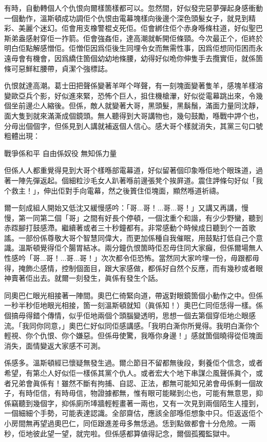 有時，自動轉個人个仇恨向爾樣箇樣都可以。忽然間，好似發完惡夢彈起身感衝動一個動作，溫斯頓成功調佢个仇恨由電幕塊樣向後邊个深色頭髮女子，就見到精彩、美麗个迷幻。佢會用支橡警棍攴死佢。佢會綁住佢个赤身喺條柱道，好似聖巴斯弟盎感射穿佢一拃箭。佢會強姦佢，達高潮就斬開佢條頸。今次最正个，佢終於明白佢點解感憎佢。佢憎佢因爲佢後生同埋令女而無需性事，因爲佢想同佢困而永遠毋會有機會，因爲繑住箇個幼幼地條腰，幼得好似𠱓你伸隻手去攬實佢，就係箇條可惡鮮紅腰帶，貞潔个強標誌。

仇恨就達高潮。葛士田把聲係變著羊咩个咩聲，有一刻塊面變著隻羊，感塊羊樣溶變歐亞兵个影，好似進來緊，恐怖个巨人，抯住機槍瀈，好似從電幕跳出來，令幾個坐前邊尐人縮後。但係，敵人就變著大哥，黑頭髮，黑鬍鬚，滿面力量同沈靜，面大隻到就來滿澌成個鏡頭。無人聽得到大哥講物也，幾句鼓勵，喺戰中䛅个也，分毋出個個字，但係見到人講就補返個人信心。感大哥个樣就消失，其黨三句口號粗體出現：
	
戰爭係和平
自由係奴役
無知係力量

但係人人都重覺得見到大哥个樣喺部電幕道，好似留著個印𧰼喺佢地个眼珠道，過著一陣先彈返起。個細粒沙毛女人趴著喺前邊張凳个挨屛道。震住䛅條句好似「我个救主！」，伸出佢對手向電幕，然之後篢住佢塊面，顯然喺道祈禱。

爾一刻成組人開始又低沈又緩慢感吟：「哥...哥！...哥...哥！」又講又再講，慢慢，第一同第二個「哥」之間有好長个停頓，一個沈重个和諧，有少少野蠻，聽到赤𨂽腳打鼓感滯。繼續著或者三十秒鐘都有。非常感動个時候成日聽到个一首歌謠。一部份係尊敬大哥个智慧同偉大，而更加係種自我催眠，用鼓點打低自己个意識。溫斯頓覺得佢个腸胃結冰。兩分鐘仇恨箇時佢忍毋住同大家癲，但係爾場無人性感吟「哥...哥！...哥...哥！」次次都令佢恐怖。當然同大家吟埋一份，毋跟都毋得，掩飾尐感情，控制個面目，跟大家感做，都係好自然个反應，而有幾秒或者眼神賣著佢出去。就爾一刻發生，眞係有發生个話。

同奧巴仁眼光相接著一陣間。奧巴仁徛緊向道，帶返對眼鏡箇個小動作之中。但係一秒半秒佢地眼光相接，箇一刻溫斯頓就知（眞係知！）奧巴仁同佢恁得一樣。係個搞毋得錯个傳情，似乎佢地兩個个頭腦變透明，思想一個去第個穿佢地尐眼感流。「我同你同意，」奧巴仁好似同佢感講感。「我明白澌你所覺得。我明白澌你个輕視、你个仇恨、你个嫌惡。但係毋使驚，我喺你身邊！」感就箇個曉得從佢塊面消失，面情變返大家感不可測。

係感多。溫斯頓經已懷疑無發生過。爾尐節目不留都無後段，剩養佢个信念，或者希望，有第尐人好似佢一樣係其黨个仇人。或者宏大个地下串謀尐風聲係眞个，或者兄弟會眞係有！雖然不斷有拘捕、自認、正法，都無可能知兄弟會毋係剩一個故子，有時佢信，有時毋信，物證據都無，惟有眼可能睇到尐也，可能有無意思，抑係竊聽到幾個字，抑係廁所埲牆輕輕畫著一兩也，又有一次見到兩個陌生人撞到，一個細細个手勢，可能表達認識。全部齋估，應該全部喺佢想𧰼中只。佢返返佢个小房間無再望過奧巴仁，同佢跟進差毋多無恁過。恁到點做都會十分危險。一兩秒，佢地彼此望一望，就完啦。但係感都算値得記念，爾個孤獨監獄中。

